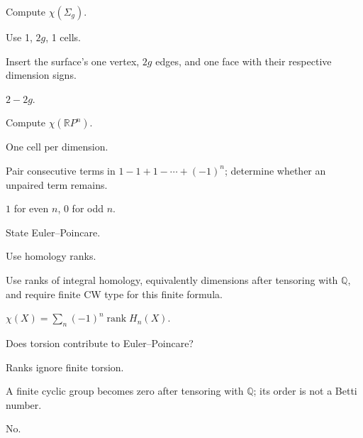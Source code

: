 \begin{exercise}\label{exr:viii21-10}
Compute \(\chi(\Sigma_g)\).
\end{exercise}
\begin{hint}
Use 1, \(2g\), 1 cells.

Insert the surface's one vertex, \(2g\) edges, and one face with their respective dimension signs.
\end{hint}
\begin{solution}
\(2-2g\).
\end{solution}

\begin{exercise}\label{exr:viii21-11}
Compute \(\chi(\mathbb RP^n)\).
\end{exercise}
\begin{hint}
One cell per dimension.

Pair consecutive terms in \(1-1+1-\cdots+(-1)^n\); determine whether an unpaired term remains.
\end{hint}
\begin{solution}
\(1\) for even \(n\), \(0\) for odd \(n\).
\end{solution}

\begin{exercise}\label{exr:viii21-12}
State Euler--Poincare.
\end{exercise}
\begin{hint}
Use homology ranks.

Use ranks of integral homology, equivalently dimensions after tensoring with \(\mathbb Q\), and require finite CW type for this finite formula.
\end{hint}
\begin{solution}
\(\chi(X)=\sum_n(-1)^n\operatorname{rank}H_n(X)\).
\end{solution}

\begin{exercise}\label{exr:viii21-13}
Does torsion contribute to Euler--Poincare?
\end{exercise}
\begin{hint}
Ranks ignore finite torsion.

A finite cyclic group becomes zero after tensoring with \(\mathbb Q\); its order is not a Betti number.
\end{hint}
\begin{solution}
No.
\end{solution}


